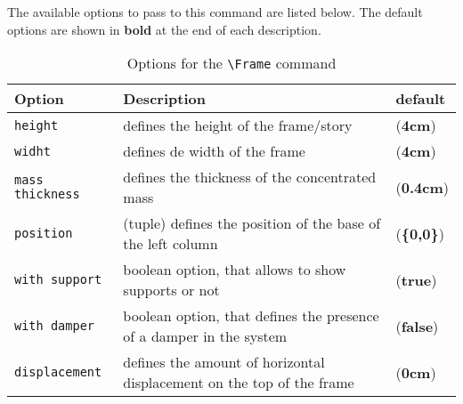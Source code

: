 \documentclass[11pt,letterpaper,oneside]{book}
\begin{document}
The available options to pass to this command are listed below. The default options are shown in \textbf{bold} at the end of each description.\par
\begin{table}[!h]
  \centering
  \caption{Options for the \texttt{\textbackslash Frame} command}
  \begin{tabular}{l p{8cm} l}\toprule
    Option & Description & default \\\midrule
    \texttt{height} & defines the height of the frame/story & (\textbf{4cm})                                      \\
    \texttt{widht}  & defines de width of the frame & (\textbf{4cm})                                              \\
    \texttt{mass thickness} & defines the thickness of the concentrated mass & (\textbf{0.4cm})                   \\
    \texttt{position} & (tuple) defines the position of the base of the left column & (\textbf{\{0,0\}})          \\
    \texttt{with support} & boolean option, that allows to show supports or not & (\textbf{true})                 \\
    \texttt{with damper} & boolean option, that defines the presence of a damper in the system & (\textbf{false}) \\
    \texttt{displacement} & defines the amount of horizontal displacement on the top of the frame & (\textbf{0cm})\\\bottomrule
  \end{tabular}
  \label{tab:frameOptions}
\end{table}

\begin{figure}[!ht]
  \centering
  \subfloat[  ]{%
    \begin{tikzpicture}[scale=0.6]
      \Frame[position = {0cm,0em}, height = 6cm]
      \Frame[position = {0cm,6cm},height = 4cm, with support = false]
      \Frame[position = {0cm,10cm},height = 4cm, with support = false]
    \end{tikzpicture}
  }
  \qquad
  \subfloat[  ]{%
    \begin{tikzpicture}[scale=0.6]
      \Frame[position = {0em,0em}, displacement = 0.15cm]
      \Frame[position = {0.15cm,4cm}, with support = false, displacement = 1.35cm]
      \Frame[position = {1.5cm,8cm}, with support = false, displacement = 3.4cm]
    \end{tikzpicture}
  }

  \label{fig:rigi1}
\end{figure}
\end{document}
